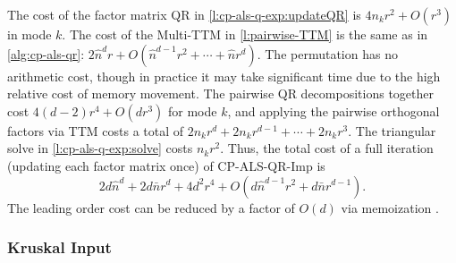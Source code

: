 \documentclass{article}
\begin{document}
The cost of the factor matrix QR in \cref{l:cp-als-q-exp:updateQR} is $4n_kr^2+O(r^3)$ in mode $k$.
The cost of the Multi-TTM in \cref{l:pairwise-TTM} is the same as in \cref{alg:cp-als-qr}: $2\hat{n}^dr+O(\hat{n}^{d-1}r^2 + \cdots + \hat{n}r^d)$.
The permutation has no arithmetic cost, though in practice it may take significant time due to the high relative cost of memory movement.
The pairwise QR decompositions together cost $4(d-2)r^4 + O(dr^3)$ for mode $k$, and applying the pairwise orthogonal factors via TTM costs a total of $2n_kr^d+2n_kr^{d-1}+\cdots+2n_kr^3$.
The triangular solve in \cref{l:cp-als-q-exp:solve} costs $n_kr^2$.
Thus, the total cost of a full iteration (updating each factor matrix once) of CP-ALS-QR-Imp is
$$ 2d\hat{n}^d + 2d\bar{n}r^d + 4d^2r^4 + O(d\hat{n}^{d-1}r^2 + d\bar{n}r^{d-1}). $$
The leading order cost can be reduced by a factor of $O(d)$ via memoization \cite{KR19}.

\subsubsection{Kruskal Input} \label{sec:QR-PW-k}
\end{document}
